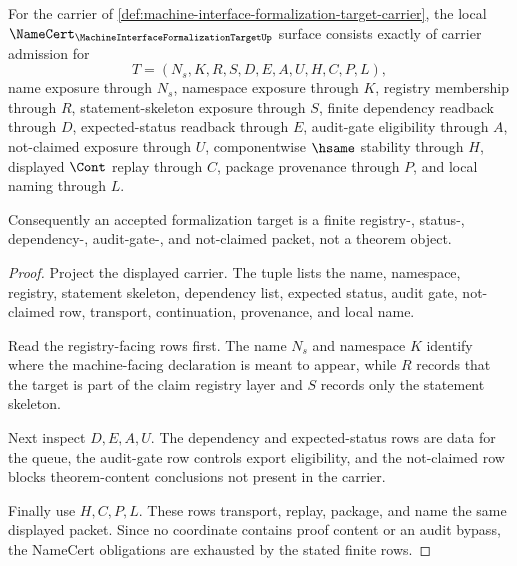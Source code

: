 \begin{theorem}
\label{thm:machine-interface-formalization-target-namecert-obligations}
For the carrier of \autoref{def:machine-interface-formalization-target-carrier}, the local $\NameCert_{\MachineInterfaceFormalizationTargetUp}$ surface consists exactly of carrier admission for
$$
T=(N_s,K,R,S,D,E,A,U,H,C,P,L),
$$
name exposure through $N_s$, namespace exposure through $K$, registry membership through $R$, statement-skeleton exposure through $S$, finite dependency readback through $D$, expected-status readback through $E$, audit-gate eligibility through $A$, not-claimed exposure through $U$, componentwise $\hsame$ stability through $H$, displayed $\Cont$ replay through $C$, package provenance through $P$, and local naming through $L$.

Consequently an accepted formalization target is a finite registry-, status-, dependency-, audit-gate-, and not-claimed packet, not a theorem object.
\end{theorem}
\begin{proof}
Project the displayed carrier. The tuple lists the name, namespace, registry, statement skeleton, dependency list, expected status, audit gate, not-claimed row, transport, continuation, provenance, and local name.

Read the registry-facing rows first. The name $N_s$ and namespace $K$ identify where the machine-facing declaration is meant to appear, while $R$ records that the target is part of the claim registry layer and $S$ records only the statement skeleton.

Next inspect $D,E,A,U$. The dependency and expected-status rows are data for the queue, the audit-gate row controls export eligibility, and the not-claimed row blocks theorem-content conclusions not present in the carrier.

Finally use $H,C,P,L$. These rows transport, replay, package, and name the same displayed packet. Since no coordinate contains proof content or an audit bypass, the NameCert obligations are exhausted by the stated finite rows.
\end{proof}

